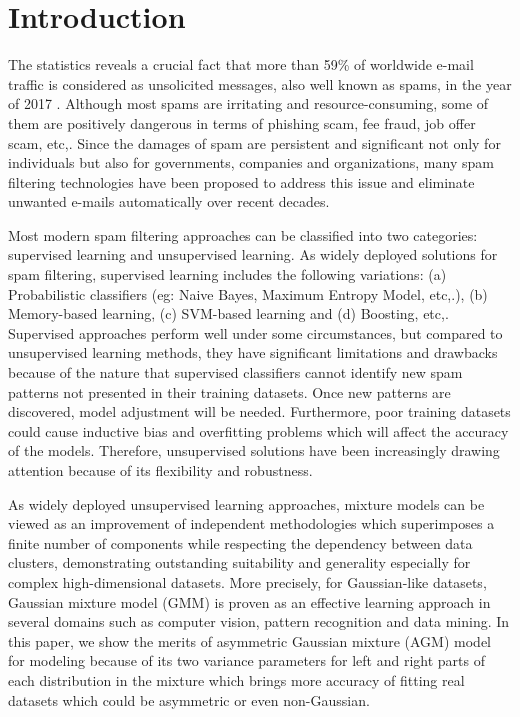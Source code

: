 \documentclass[conference]{IEEEtran}
\begin{document}
\section{Introduction}
The statistics reveals a crucial fact that more than 59\% of worldwide e-mail traffic is considered as unsolicited messages, also well known as spams, in the year of 2017 \cite{spamStats}. Although most spams are irritating and resource-consuming, some of them are positively dangerous in terms of phishing scam, fee fraud, job offer scam, etc,. Since the damages of spam are persistent and significant not only for individuals but also for governments, companies and organizations, many spam filtering technologies have been proposed to address this issue and eliminate unwanted e-mails automatically over recent decades. 

Most modern spam filtering approaches can be classified into two categories: supervised learning and unsupervised learning. As widely deployed solutions for spam filtering, supervised learning includes the following variations: (a) Probabilistic classifiers (eg: Naive Bayes\cite{NB}, Maximum Entropy Model\cite{Entropy}, etc,.), (b) Memory-based learning\cite{MEM}, (c) SVM-based learning\cite{SVM} and (d) Boosting\cite{Boosting}, etc,. Supervised approaches perform well under some circumstances, but compared to unsupervised learning methods, they have significant limitations and drawbacks because of the nature that supervised classifiers cannot identify new spam patterns not presented in their training datasets. Once new patterns are discovered, model adjustment will be needed. Furthermore, poor training datasets could cause inductive bias and overfitting problems which will affect the accuracy of the models. Therefore, unsupervised solutions have been increasingly drawing attention because of its flexibility and robustness.

As widely deployed unsupervised learning approaches, mixture models can be viewed as an improvement of independent methodologies which superimposes a finite number of components while respecting the dependency between data clusters, demonstrating outstanding suitability and generality especially for complex high-dimensional datasets. More precisely, for Gaussian-like datasets, Gaussian mixture model (GMM) \cite{b1} is proven as an effective   learning approach in several domains such as computer vision, pattern recognition and data mining. In this paper, we show the merits of asymmetric Gaussian mixture (AGM) model \cite{b2} for modeling because of its two variance parameters for left and right parts of each distribution in the mixture which brings more accuracy of fitting real datasets which could be asymmetric or even non-Gaussian. 
\end{document}
